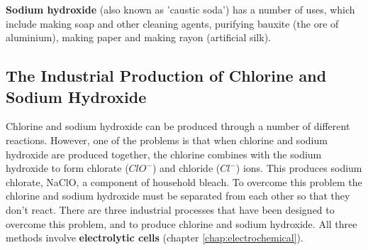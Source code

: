 \textbf{Sodium hydroxide} (also known as 'caustic soda') has a number of uses, which include making soap and other cleaning agents, purifying bauxite (the ore of aluminium), making paper and making rayon (artificial silk).

\subsection{The Industrial Production of Chlorine and Sodium Hydroxide}

Chlorine and sodium hydroxide can be produced through a number of different reactions. However, one of the problems is that when chlorine and sodium hydroxide are produced together, the chlorine combines with the sodium hydroxide to form chlorate ($ClO^{-}$) and chloride ($Cl^{-}$) ions. This produces sodium chlorate, NaClO, a component of household bleach. To overcome this problem the chlorine and sodium hydroxide must be separated from each other so that they don't react. There are three industrial processes that have been designed to overcome this problem, and to produce chlorine and sodium hydroxide. All three methods involve \textbf{electrolytic cells} (chapter \ref{chap:electrochemical}). 
\\



